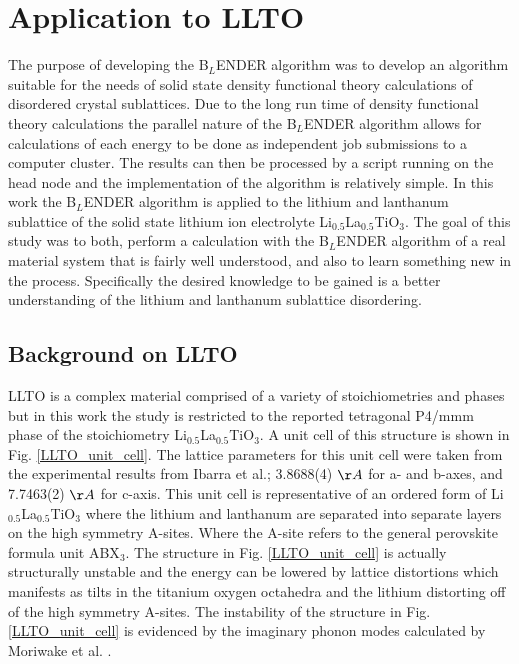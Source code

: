 \documentclass[aps,pre,reprint,superscriptaddress,showkeys]{revtex4-1}
\begin{document}
\section{Application to LLTO}
\label{sec3}
The purpose of developing the B$_L$ENDER algorithm was to develop an algorithm suitable for the needs of solid state density functional theory calculations of disordered crystal sublattices.  Due to the long run time of density functional theory calculations  the parallel nature of the B$_L$ENDER algorithm allows for calculations of each energy to be done as independent job submissions to a computer cluster. The results can then be processed by a script running on the head node and the implementation of the algorithm is relatively simple.  In this work the B$_L$ENDER algorithm is applied to the lithium and lanthanum sublattice of the solid state lithium ion electrolyte  Li$_{0.5}$La$_{0.5}$TiO$_{3}$. The goal of this study was to both, perform a calculation with the B$_L$ENDER algorithm  of a real material system that is fairly well understood, and also to learn something new in the process.  Specifically the desired knowledge to be gained is a better understanding of the lithium and lanthanum sublattice disordering. 

\subsection{Background on LLTO}
LLTO is a complex material comprised of a variety of stoichiometries and phases but in this work the study is restricted to the reported tetragonal P4/mmm phase of the stoichiometry Li$_{0.5}$La$_{0.5}$TiO$_{3}$\cite{LLTOreview,P4mmmstrucuture}. A unit cell of this structure is shown in Fig. \ref{LLTO_unit_cell}. The lattice parameters for this unit cell were taken from the experimental results from Ibarra et al.\cite{P4mmmstrucuture}; 3.8688(4) $\AA$ for a- and b-axes, and 7.7463(2) $\AA$ for c-axis.  This unit cell is representative of an ordered form of Li$_{0.5}$La$_{0.5}$TiO$_{3}$ where the lithium and lanthanum are separated into separate layers on the high symmetry A-sites. Where the A-site refers to the general perovskite formula unit ABX$_3$.  The structure in Fig. \ref{LLTO_unit_cell} is actually structurally unstable and the energy can be lowered by lattice distortions which manifests as tilts in the titanium oxygen octahedra and the lithium  distorting off of the high symmetry A-sites. The instability of the structure in Fig. \ref{LLTO_unit_cell} is evidenced by the imaginary phonon modes calculated by Moriwake et al. \cite{imaginary_phonons}.  
\end{document}
